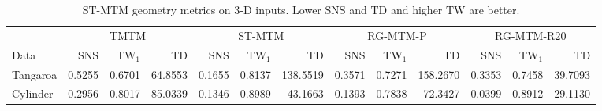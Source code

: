 \begin{table}[t]
\caption{ST-MTM geometry metrics on 3-D inputs. Lower SNS and TD and higher TW are better.}\label{tab:geometry3d}
\centering\scriptsize\setlength{\tabcolsep}{3pt}
\begin{tabular}{lrrrrrrrrrrrr}\toprule
 & \multicolumn{3}{c}{TMTM} & \multicolumn{3}{c}{ST-MTM} & \multicolumn{3}{c}{RG-MTM-P} & \multicolumn{3}{c}{RG-MTM-R20}\\
Data & SNS & TW$_1$ & TD & SNS & TW$_1$ & TD & SNS & TW$_1$ & TD & SNS & TW$_1$ & TD\\\midrule
Tangaroa & 0.5255 & 0.6701 & 64.8553 & 0.1655 & 0.8137 & 138.5519 & 0.3571 & 0.7271 & 158.2670 & 0.3353 & 0.7458 & 39.7093\\
Cylinder & 0.2956 & 0.8017 & 85.0339 & 0.1346 & 0.8989 & 43.1663 & 0.1393 & 0.7838 & 72.3427 & 0.0399 & 0.8912 & 29.1130\\
\bottomrule\end{tabular}
\par{}
\end{table}
